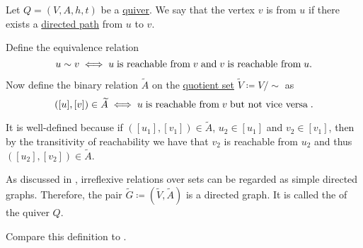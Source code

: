\begin{definition}\label{def:quiver_condensation}
  Let \( Q = (V, A, h, t) \) be a \hyperref[def:quiver]{quiver}. We say that the vertex \( v \) is  from \( u \) if there exists a \hyperref[def:quiver_path]{directed path} from \( u \) to \( v \).

  Define the equivalence relation
  \begin{equation*}
    u \sim v \iff u \T{is reachable from} v \T{and} v \T{is reachable from} u.
  \end{equation*}

  Now define the binary relation \( \widetilde{A} \) on the \hyperref[def:equivalence_relation/quotient]{quotient set} \( \widetilde{V} \coloneqq V / {\sim} \) as
  \begin{equation*}
    ([u], [v]) \in \widetilde{A} \iff u \T{is reachable from} v \T{but not vice versa}.
  \end{equation*}

  It is well-defined because if \( ([u_1], [v_1]) \in \widetilde{A} \), \( u_2 \in [u_1] \) and \( v_2 \in [v_1] \), then by the transitivity of reachability we have that \( v_2 \) is reachable from \( u_2 \) and thus \( ([u_2], [v_2]) \in \widetilde{A} \).

  As discussed in , irreflexive relations over sets can be regarded as simple directed graphs. Therefore, the pair \( \widetilde{G} \coloneqq (\widetilde{V}, \widetilde{A}) \) is a directed graph. It is called the  of the quiver \( Q \).

  Compare this definition to .
\end{definition}

